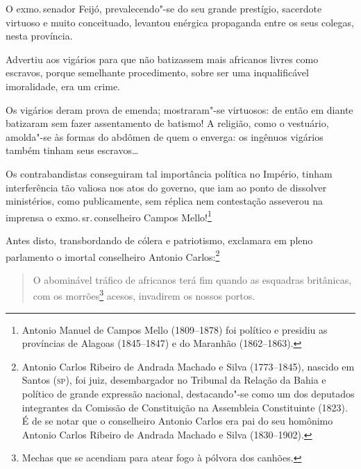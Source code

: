 O exmo.\,senador Feijó, prevalecendo"-se do seu grande prestígio,
sacerdote virtuoso e muito conceituado, levantou enérgica propaganda
entre os seus colegas, nesta província.

Advertiu aos vigários para que não batizassem mais africanos livres como
escravos, porque semelhante procedimento, sobre ser uma inqualificável
imoralidade, era um crime.

Os vigários deram prova de emenda; mostraram"-se virtuosos: de então em
diante batizaram sem fazer assentamento de batismo! A religião, como o
vestuário, amolda"-se às formas do abdômen de quem o enverga: os ingênuos
vigários também tinham seus escravos\ldots{}

Os contrabandistas conseguiram tal importância política no Império,
tinham interferência tão valiosa nos atos do governo, que iam ao ponto
de dissolver ministérios, como publicamente, sem réplica nem contestação
asseverou na imprensa o exmo.\,sr.\,conselheiro Campos Mello!\footnote{
  Antonio Manuel de Campos Mello (1809--1878) foi político e presidiu as
  províncias de Alagoas (1845--1847) e do Maranhão (1862--1863).}

Antes disto, transbordando de cólera e patriotismo, exclamara em pleno
parlamento o imortal conselheiro Antonio Carlos:\footnote{Antonio
  Carlos Ribeiro de Andrada Machado e Silva (1773--1845), nascido em
  Santos (\textsc{sp}), foi juiz, desembargador no Tribunal da Relação da Bahia e
  político de grande expressão nacional, destacando"-se como um dos
  deputados integrantes da Comissão de Constituição na Assembleia
  Constituinte (1823). É de se notar que o conselheiro Antonio Carlos
  era pai do seu homônimo Antonio Carlos Ribeiro de Andrada Machado e
  Silva (1830--1902).}


\begin{quote}
O abominável tráfico de africanos terá fim quando as esquadras
britânicas, com os morrões\footnote{Mechas que se acendiam para atear
  fogo à pólvora dos canhões.} acesos, invadirem os nossos portos.
\end{quote}

